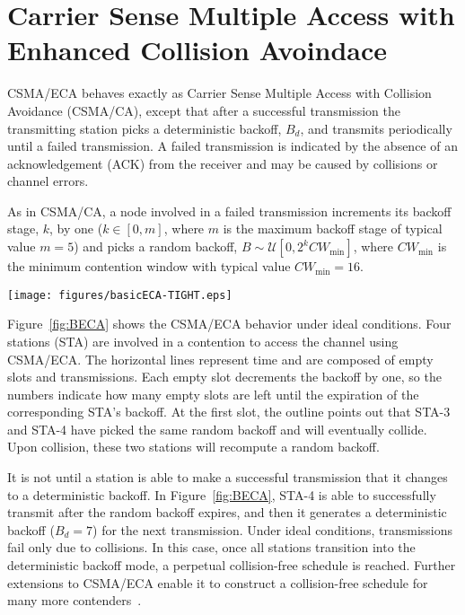 \documentclass[conference]{IEEEtran}
\begin{document}

\section{Carrier Sense Multiple Access with Enhanced Collision Avoindace}

CSMA/ECA behaves exactly as Carrier Sense Multiple Access with Collision Avoidance (CSMA/CA), except that after a successful transmission the transmitting station picks a deterministic backoff, $B_{d}$, and transmits periodically until a failed transmission. A failed transmission is indicated by the absence of an acknowledgement (ACK) from the receiver and may be caused by collisions or channel errors.

As in CSMA/CA, a node involved in a failed transmission increments its backoff stage, $k$, by one ($k\in[0,m]$, where $m$ is the maximum backoff stage of typical value $m=5$) and picks a random backoff, $B\sim \mathcal{U}[0,2^{k}CW_{\min}]$, where $CW_{\min}$ is the minimum contention window with typical value $CW_{\min}=16$.

	\begin{figure*}[tb]
		\centering
		\texttt{[image: figures/basicECA-TIGHT.eps]}
		\caption{CSMA/ECA with four stations in saturation ($B_{d}=7$).}
		\label{fig:BECA}
	\end{figure*}

Figure~\ref{fig:BECA} shows the CSMA/ECA behavior under ideal conditions. Four stations (STA) are involved in a contention to access the channel using CSMA/ECA. The horizontal lines represent time and are composed of empty slots and transmissions. Each empty slot decrements the backoff by one, so the numbers indicate how many empty slots are left until the expiration of the corresponding STA's backoff. At the first slot, the outline points out that STA-3 and STA-4 have picked the same random backoff and will eventually collide. Upon collision, these two stations will recompute a random backoff.

It is not until a station is able to make a successful transmission that it changes to a deterministic backoff. In Figure~\ref{fig:BECA}, STA-4 is able to successfully transmit after the random backoff expires, and then it generates a deterministic backoff ($B_{d}=7$) for the next transmission. Under ideal conditions, transmissions fail only due to collisions. In this case, once all stations transition into the deterministic backoff mode, a perpetual collision-free schedule is reached. Further extensions to CSMA/ECA enable it to construct a collision-free schedule for many more contenders~\cite{research2standards}.
\end{document}
